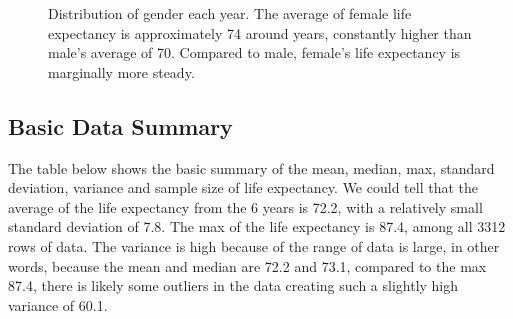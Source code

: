 \documentclass[
  letterpaper,
  DIV=11,
  numbers=noendperiod]{scrartcl}
\begin{document}
\begin{figure}


\caption{\label{fig-gender}Distribution of gender each year. The average
of female life expectancy is approximately 74 around years, constantly
higher than male's average of 70. Compared to male, female's life
expectancy is marginally more steady.}

\end{figure}%

\subsection{Basic Data Summary}\label{basic-data-summary}

The table below shows the basic summary of the mean, median, max,
standard deviation, variance and sample size of life expectancy. We
could tell that the average of the life expectancy from the 6 years is
72.2, with a relatively small standard deviation of 7.8. The max of the
life expectancy is 87.4, among all 3312 rows of data. The variance is
high because of the range of data is large, in other words, because the
mean and median are 72.2 and 73.1, compared to the max 87.4, there is
likely some outliers in the data creating such a slightly high variance
of 60.1.
\end{document}
